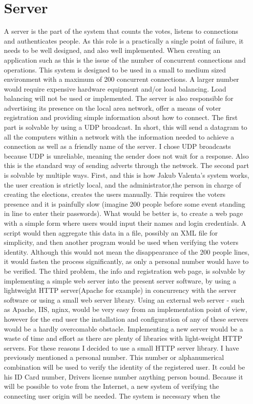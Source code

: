\documentclass[11pt,twoside,a4paper]{book}
\begin{document}
\section{Server}
A server is the part of the system that counts the votes, listens to connections and authenticates people. As this role is a practically a single point of failure, it needs to be well designed, and also well implemented. When creating an application such as this is the issue of the number of concurrent connections and operations. This system is designed to be used in a small to medium sized environment with  a maximum of 200 concurrent connections. A larger number would require expensive hardware equipment and/or load balancing. Load balancing will not be used or implemented. The server is also responsible for advertising its presence on the local area network, offer a means of voter registration and providing simple information about how to connect. The first part is solvable by using a UDP\cite{whatIsUPD} broadcast\cite{whatIsBroadcasting}. In short, this will send a datagram to all the computers within a network with the information needed to achieve a connection as well as a friendly name of the server. I chose UDP broadcasts because UDP is unreliable, meaning the sender does not wait for a response. Also this is the standard way of sending adverts through the network. The second part is solvable by multiple ways. First, and this is how Jakub Valenta's system works, the user creation is strictly local, and the administrator,the person in charge of creating the elections, creates the users manually. This requires the voters presence and  it is painfully slow (imagine 200 people before some event standing in line to enter their passwords). What would be better is, to create a web page with a simple form where users would input their names and login credentials. A script would then aggregate this data in a file, possibly an XML file for simplicity, and then another program would be used when verifying the voters identity. Although this would not mean the disappearance of the 200 people lines, it would fasten the process significantly, as only a personal number would have to be verified. The third problem, the info and registration web page, is solvable by implementing a simple web server into the present server software, by using a lightweight HTTP server(Apache for example)  in concurrency with the server software or using a small web server library. Using an external web server - such as Apache, IIS, nginx, would be very easy from an implementation point of view, however for the end user the installation and configuration of any of these servers would be a hardly overcomable obstacle. Implementing a new server would be a waste of time and effort as there are plenty of libraries with light-weight HTTP servers. For these reasons I decided to use a small HTTP server library. I have previously mentioned a personal number. This number or alphanumerical combination will be used to verify the identity of the registered user. It could be his ID Card number, Drivers license number anything person bound. Because it will be possible to vote from the Internet, a new system of verifying the connecting user origin will be needed. The system is necessary when the 
\end{document}
